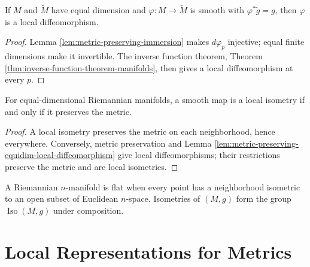 \begin{lemma}
\label{lem:metric-preserving-equidim-local-diffeomorphism}





If $M$ and $\widetilde M$ have equal dimension and $\varphi:M\to\widetilde M$ is smooth with $\varphi^*\widetilde g=g$, then $\varphi$ is a local diffeomorphism.
\end{lemma}
\begin{proof}

\sketch Lemma \ref{lem:metric-preserving-immersion} makes $d\varphi_p$ injective; equal finite dimensions make it invertible. The inverse function theorem, Theorem \ref{thm:inverse-function-theorem-manifolds}, then gives a local diffeomorphism at every $p$.
\end{proof}

\begin{proposition}
\label{prop:characterize-local-isometry}


For equal-dimensional Riemannian manifolds, a smooth map is a local isometry
if and only if it preserves the metric.
\end{proposition}
\begin{proof}

\sketch A local isometry preserves the metric on each neighborhood, hence everywhere. Conversely, metric preservation and Lemma \ref{lem:metric-preserving-equidim-local-diffeomorphism} give local diffeomorphisms; their restrictions preserve the metric and are local isometries.
\end{proof}

A Riemannian $n$-manifold is flat when every point has a neighborhood isometric to an open subset of Euclidean $n$-space. Isometries of $(M,g)$ form the group $\operatorname{Iso}(M,g)$ under composition.

\section{Local Representations for Metrics}

